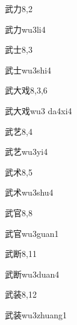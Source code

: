 \begin{entry}{武力}{8,2}
  \begin{phonetics}{武力}{wu3li4}
  \end{phonetics}
\end{entry}

\begin{entry}{武士}{8,3}
  \begin{phonetics}{武士}{wu3shi4}
  \end{phonetics}
\end{entry}

\begin{entry}{武大戏}{8,3,6}
  \begin{phonetics}{武大戏}{wu3 da4xi4}
  \end{phonetics}
\end{entry}

\begin{entry}{武艺}{8,4}
  \begin{phonetics}{武艺}{wu3yi4}
  \end{phonetics}
\end{entry}

\begin{entry}{武术}{8,5}
  \begin{phonetics}{武术}{wu3shu4}
  \end{phonetics}
\end{entry}

\begin{entry}{武官}{8,8}
  \begin{phonetics}{武官}{wu3guan1}
  \end{phonetics}
\end{entry}

\begin{entry}{武断}{8,11}
  \begin{phonetics}{武断}{wu3duan4}
  \end{phonetics}
\end{entry}

\begin{entry}{武装}{8,12}
  \begin{phonetics}{武装}{wu3zhuang1}
  \end{phonetics}
\end{entry}

